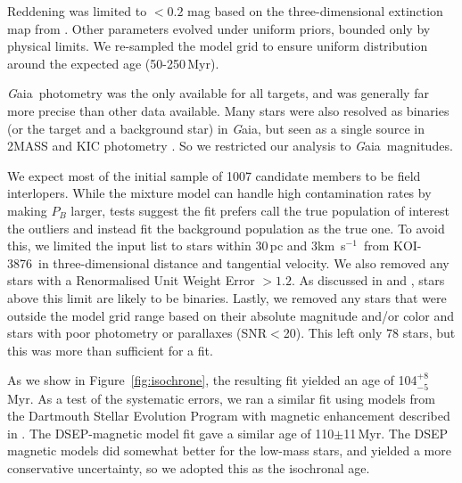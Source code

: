 \documentclass[twocolumn]{aastex631}
\newcommand{\starname}{KOI-3876}
\newcommand\kms{km~s$^{-1}$}
\newcommand{\gaia}{{\textit Gaia}}
\begin{document}
Reddening was limited to $<0.2$ mag based on the three-dimensional extinction map from \citet{2019ApJ...887...93G}. Other parameters evolved under uniform priors, bounded only by physical limits. We re-sampled the model grid to ensure uniform distribution around the expected age (50-250\,Myr). 

\gaia\ photometry was the only available for all targets, and was generally far more precise than other data available. Many stars were also resolved as binaries (or the target and a background star) in \gaia, but seen as a single source in 2MASS and KIC photometry \citep{Brown2011}. So we restricted our analysis to \gaia\ magnitudes. 

We expect most of the initial sample of 1007 candidate members to be field interlopers. While the mixture model can handle high contamination rates by making $P_B$ larger,  tests suggest the fit prefers call the true population of interest the outliers and instead fit the background population as the true one. To avoid this, we limited the input list to stars within 30\,pc and 3\kms\ from \starname\ in three-dimensional distance and tangential velocity. We also removed any stars with a Renormalised Unit Weight Error \citep[RUWE; ][]{GaiaEDR3} $>1.2$. As discussed in \citet{Ziegler2020} and \citet{2021arXiv210609040W}, stars above this limit are likely to be binaries. Lastly, we removed any stars that were outside the model grid range based on their absolute magnitude and/or color and stars with poor photometry or parallaxes (SNR$<$20). This left only 78 stars, but this was more than sufficient for a fit.%

As we show in Figure~\ref{fig:isochrone}, the resulting fit yielded an age of 104$^{+8}_{-5}$\,Myr. As a test of the systematic errors, we ran a similar fit using models from the Dartmouth Stellar Evolution Program \citep[DSEP,][]{Dotter2008} with magnetic enhancement described in \citet{Feiden2012b}. The DSEP-magnetic model fit gave a similar age of 110$\pm$11\,Myr. The DSEP magnetic models did somewhat better for the low-mass stars, and yielded a more conservative uncertainty, so we adopted this as the isochronal age.
\end{document}
